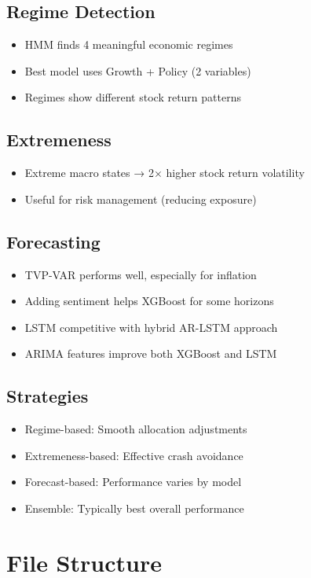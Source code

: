 \documentclass[11pt,a4paper]{article}
\begin{document}
\subsection{Regime Detection}
\begin{itemize}
    \item HMM finds 4 meaningful economic regimes
    \item Best model uses Growth + Policy (2 variables)
    \item Regimes show different stock return patterns
\end{itemize}

\subsection{Extremeness}
\begin{itemize}
    \item Extreme macro states → 2× higher stock return volatility
    \item Useful for risk management (reducing exposure)
\end{itemize}

\subsection{Forecasting}
\begin{itemize}
    \item TVP-VAR performs well, especially for inflation
    \item Adding sentiment helps XGBoost for some horizons
    \item LSTM competitive with hybrid AR-LSTM approach
    \item ARIMA features improve both XGBoost and LSTM
\end{itemize}

\subsection{Strategies}
\begin{itemize}
    \item Regime-based: Smooth allocation adjustments
    \item Extremeness-based: Effective crash avoidance
    \item Forecast-based: Performance varies by model
    \item Ensemble: Typically best overall performance
\end{itemize}

\section{File Structure}
\end{document}
